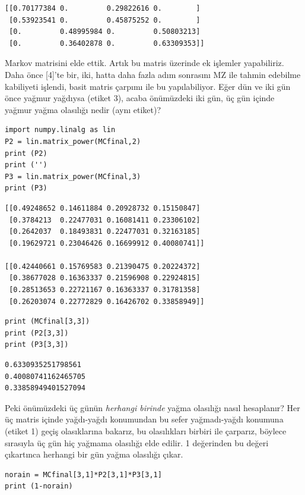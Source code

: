 \documentclass[12pt,fleqn]{article}\usepackage{../../common}
\begin{document}
\begin{verbatim}
[[0.70177384 0.         0.29822616 0.        ]
 [0.53923541 0.         0.45875252 0.        ]
 [0.         0.48995984 0.         0.50803213]
 [0.         0.36402878 0.         0.63309353]]
\end{verbatim}

Markov matrisini elde ettik. Artık bu matris üzerinde ek işlemler
yapabiliriz. Daha önce [4]'te bir, iki, hatta daha fazla adım sonrasını MZ ile
tahmin edebilme kabiliyeti işlendi, basit matris çarpımı ile bu
yapılabiliyor. Eğer dün ve iki gün önce yağmur yağdıysa (etiket 3), acaba
önümüzdeki iki gün, üç gün içinde yağmur yağma olasılığı nedir (aynı etiket)?

\begin{verbatim}
import numpy.linalg as lin
P2 = lin.matrix_power(MCfinal,2)
print (P2)
print ('')
P3 = lin.matrix_power(MCfinal,3)
print (P3)
\end{verbatim}

\begin{verbatim}
[[0.49248652 0.14611884 0.20928732 0.15150847]
 [0.3784213  0.22477031 0.16081411 0.23306102]
 [0.2642037  0.18493831 0.22477031 0.32163185]
 [0.19629721 0.23046426 0.16699912 0.40080741]]

[[0.42440661 0.15769583 0.21390475 0.20224372]
 [0.38677028 0.16363337 0.21596908 0.22924815]
 [0.28513653 0.22721167 0.16363337 0.31781358]
 [0.26203074 0.22772829 0.16426702 0.33858949]]
\end{verbatim}

\begin{verbatim}
print (MCfinal[3,3])
print (P2[3,3])
print (P3[3,3])
\end{verbatim}

\begin{verbatim}
0.6330935251798561
0.40080741162465705
0.33858949401527094
\end{verbatim}

Peki önümüzdeki üç günün {\em herhangi birinde} yağma olasılığı nasıl
hesaplanır?  Her üç matris içinde yağdı-yağdı konumundan bu sefer yağmadı-yağdı
konumuna (etiket 1) geçiş olasıklarına bakarız, bu olasılıkları birbiri ile
çarparız, böylece sırasıyla üç gün hiç yağmama olasılığı elde edilir. 1
değerinden bu değeri çıkartınca herhangi bir gün yağma olasılığı çıkar.

\begin{verbatim}
norain = MCfinal[3,1]*P2[3,1]*P3[3,1]
print (1-norain)
\end{verbatim}
\end{document}
